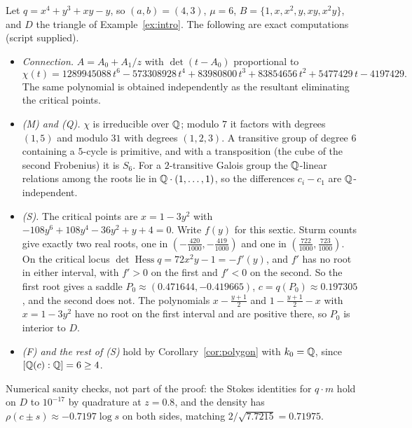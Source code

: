 \documentclass[11pt]{article}
\numberwithin{equation}{section}
\theoremstyle{definition}
\theoremstyle{remark}
\begin{document}
Let $q=x^4+y^3+xy-y$, so $(a,b)=(4,3)$, $\mu=6$,
$B=\{1,x,x^2,y,xy,x^2y\}$, and $D$ the triangle of Example~\ref{ex:intro}.
The following are exact computations (script supplied).
\begin{itemize}[leftmargin=1.6em]
\item \emph{Connection.} $A=A_0+A_1/z$ with
 $\det(t-A_0)$ proportional to
 \[
  \chi(t)=1289945088\,t^6-573308928\,t^4+83980800\,t^3+83854656\,t^2+5477429\,t-4197429.
 \]
 The same polynomial is obtained independently as the resultant eliminating
 the critical points.
\item \emph{(M) and (Q).} $\chi$ is irreducible over $\mathbb Q$; modulo $7$ it
 factors with degrees $(1,5)$ and modulo $31$ with degrees $(1,2,3)$. A
 transitive group of degree $6$ containing a $5$-cycle is primitive, and with
 a transposition (the cube of the second Frobenius) it is $S_6$. For a
 $2$-transitive Galois group the $\mathbb Q$-linear relations among the roots lie in
 $\mathbb Q\cdot(1,\dots,1)$, so the differences $c_i-c_1$ are $\mathbb Q$-independent.
\item \emph{(S).} The critical points are $x=1-3y^2$ with
 $-108y^6+108y^4-36y^2+y+4=0$. Write $f(y)$ for this sextic. Sturm counts give exactly two real roots, one in
 $(-\tfrac{420}{1000},-\tfrac{419}{1000})$ and one in
 $(\tfrac{722}{1000},\tfrac{723}{1000})$. On the critical locus
 $\det\operatorname{Hess}q=72x^2y-1=-f'(y)$, and $f'$ has no root in either
 interval, with $f'>0$ on the first and $f'<0$ on the second. So the first root
 gives a saddle $P_0\approx(0.471644,-0.419665)$, $c=q(P_0)\approx0.197305$,
 and the second does not. The polynomials $x-\tfrac{y+1}2$ and
 $1-\tfrac{y+1}2-x$ with $x=1-3y^2$ have no root on the first interval and are
 positive there, so $P_0$ is interior to $D$.
\item \emph{(F) and the rest of (S)} hold by Corollary~\ref{cor:polygon} with
 $k_0=\mathbb Q$, since $[\mathbb Q(c):\mathbb Q]=6\ge4$.
\end{itemize}
Numerical sanity checks, not part of the proof: the Stokes identities for
$q\cdot m$ hold on $D$ to $10^{-17}$ by quadrature at $z=0.8$, and the density
has $\rho(c\pm s)\approx-0.7197\log s$ on both sides, matching
$2/\sqrt{7.7215}=0.71975$.
\end{document}
